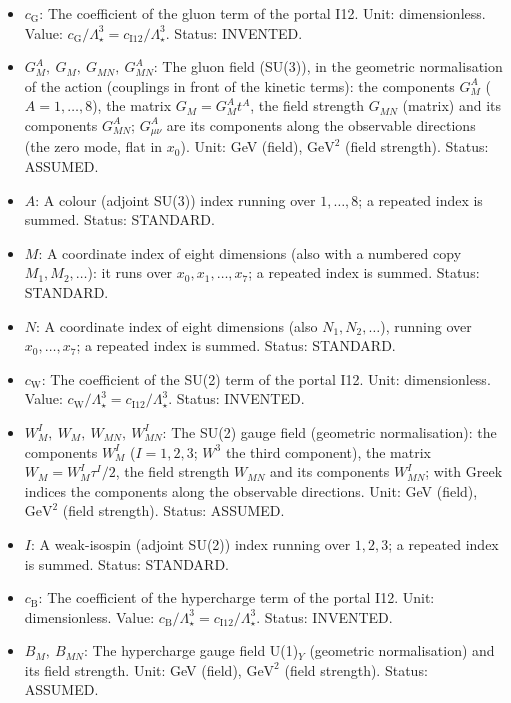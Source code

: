 \documentclass[
  10pt,
]{article}
\begin{document}
\begin{itemize}
  \(\mathcal{F} = c_{\mathrm{G}}G^A_{MN}G^{AMN} + c_{\mathrm{W}}W^I_{MN}W^{IMN} + c_{\mathrm{B}}B_{MN}B^{MN}\);
  \(\langle\mathcal{F}\rangle\) its mean value in an environment. Unit:
  \(\mathrm{GeV}^{4}\). Status: INVENTED.
\item
  \(c_{\mathrm{G}}\): The coefficient of the gluon term of the portal
  I12. Unit: dimensionless. Value:
  \(c_{\mathrm{G}}/\Lambda_\star^3 = c_{\mathrm{I12}}/\Lambda_\star^3\).
  Status: INVENTED.
\item
  \(G^A_M,\ G_M,\ G_{MN},\ G^A_{MN}\): The gluon field (SU(3)), in the
  geometric normalisation of the action (couplings in front of the
  kinetic terms): the components \(G^A_M\) (\(A = 1, \dots, 8\)), the
  matrix \(G_M = G^A_Mt^A\), the field strength \(G_{MN}\) (matrix) and
  its components \(G^A_{MN}\); \(G^A_{\mu\nu}\) are its components along
  the observable directions (the zero mode, flat in \(x_0\)). Unit: GeV
  (field), \(\mathrm{GeV}^{2}\) (field strength). Status: ASSUMED.
\item
  \(A\): A colour (adjoint SU(3)) index running over \(1, \dots, 8\); a
  repeated index is summed. Status: STANDARD.
\item
  \(M\): A coordinate index of eight dimensions (also with a numbered
  copy \(M_1, M_2, \dots\)): it runs over \(x_0, x_1, \dots, x_7\); a
  repeated index is summed. Status: STANDARD.
\item
  \(N\): A coordinate index of eight dimensions (also
  \(N_1, N_2, \dots\)), running over \(x_0, \dots, x_7\); a repeated
  index is summed. Status: STANDARD.
\item
  \(c_{\mathrm{W}}\): The coefficient of the SU(2) term of the portal
  I12. Unit: dimensionless. Value:
  \(c_{\mathrm{W}}/\Lambda_\star^3 = c_{\mathrm{I12}}/\Lambda_\star^3\).
  Status: INVENTED.
\item
  \(W^I_M,\ W_M,\ W_{MN},\ W^I_{MN}\): The SU(2) gauge field (geometric
  normalisation): the components \(W^I_M\) (\(I = 1, 2, 3\); \(W^3\) the
  third component), the matrix \(W_M = W^I_M\tau^I/2\), the field
  strength \(W_{MN}\) and its components \(W^I_{MN}\); with Greek
  indices the components along the observable directions. Unit: GeV
  (field), \(\mathrm{GeV}^{2}\) (field strength). Status: ASSUMED.
\item
  \(I\): A weak-isospin (adjoint SU(2)) index running over \(1, 2, 3\);
  a repeated index is summed. Status: STANDARD.
\item
  \(c_{\mathrm{B}}\): The coefficient of the hypercharge term of the
  portal I12. Unit: dimensionless. Value:
  \(c_{\mathrm{B}}/\Lambda_\star^3 = c_{\mathrm{I12}}/\Lambda_\star^3\).
  Status: INVENTED.
\item
  \(B_M,\ B_{MN}\): The hypercharge gauge field U(1)\(_Y\) (geometric
  normalisation) and its field strength. Unit: GeV (field),
  \(\mathrm{GeV}^{2}\) (field strength). Status: ASSUMED.
\end{itemize}
\end{document}
